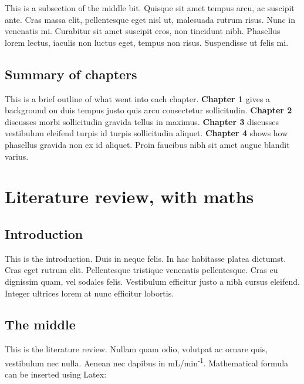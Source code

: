 \documentclass[12pt,turkish,a4paperpaper,]{report}
\begin{document}
This is a subsection of the middle bit. Quisque sit amet tempus arcu, ac
suscipit ante. Cras massa elit, pellentesque eget nisl ut, malesuada
rutrum risus. Nunc in venenatis mi. Curabitur sit amet suscipit eros,
non tincidunt nibh. Phasellus lorem lectus, iaculis non luctus eget,
tempus non risus. Suspendisse ut felis mi.

\hypertarget{summary-of-chapters}{%
\section{Summary of chapters}\label{summary-of-chapters}}

This is a brief outline of what went into each chapter. \textbf{Chapter
1} gives a background on duis tempus justo quis arcu consectetur
sollicitudin. \textbf{Chapter 2} discusses morbi sollicitudin gravida
tellus in maximus. \textbf{Chapter 3} discusses vestibulum eleifend
turpis id turpis sollicitudin aliquet. \textbf{Chapter 4} shows how
phasellus gravida non ex id aliquet. Proin faucibus nibh sit amet augue
blandit varius.

\hypertarget{literature-review-with-maths}{%
\chapter{Literature review, with
maths}\label{literature-review-with-maths}}

\thispagestyle{empty}

\hypertarget{introduction}{%
\section{Introduction}\label{introduction}}

This is the introduction. Duis in neque felis. In hac habitasse platea
dictumst. Cras eget rutrum elit. Pellentesque tristique venenatis
pellentesque. Cras eu dignissim quam, vel sodales felis. Vestibulum
efficitur justo a nibh cursus eleifend. Integer ultrices lorem at nunc
efficitur lobortis.

\hypertarget{the-middle}{%
\section{The middle}\label{the-middle}}

This is the literature review. Nullam quam odio, volutpat ac ornare
quis, vestibulum nec nulla. Aenean nec dapibus in
mL/min\textsuperscript{-1}. Mathematical formula can be inserted using
Latex:
\end{document}
